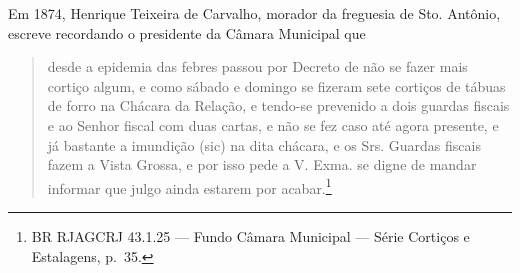 Em 1874, Henrique Teixeira de Carvalho, morador da freguesia de Sto.
Antônio, escreve recordando o presidente da Câmara Municipal que

\begin{quote}
desde a epidemia das febres passou por Decreto de não se fazer mais
cortiço algum, e como sábado e domingo se fizeram sete cortiços de
tábuas de forro na Chácara da Relação, e tendo-se prevenido a dois
guardas fiscais e ao Senhor fiscal com duas cartas, e não se fez caso
até agora presente, e já bastante a imundição (sic) na dita chácara, e
os Srs. Guardas fiscais fazem a Vista Grossa, e por isso pede a V. Exma.
se digne de mandar informar que julgo ainda estarem por
acabar.\footnote{BR RJAGCRJ 43.1.25 --- Fundo Câmara Municipal --- Série
  Cortiços e Estalagens, p.~35.}
\end{quote}

